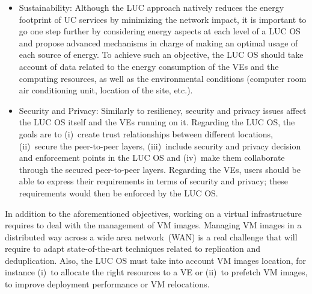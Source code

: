 \begin{itemize}
\item Sustainability: Although the LUC approach natively reduces the energy
footprint of UC services by minimizing the network impact, 
it is important to go one
step further by considering energy aspects at each level of a LUC OS
and propose advanced mechanisms in charge of making an optimal usage of each source of energy. 
 To achieve such an objective, the LUC OS should take account of data related to the energy
  consumption of the VEs  and the computing resources,
  as well as the environmental conditions (computer room air conditioning unit, location of the
  site, etc.).
\item Security and Privacy: Similarly to resiliency, security and privacy issues affect the LUC OS itself and the VEs running on it.
Regarding the LUC OS, the goals are to (i)~create trust relationships between
different locations, (ii)~secure the peer-to-peer layers, 
(iii)~include security and privacy decision and enforcement points in the LUC OS and (iv)~make them collaborate through the secured peer-to-peer layers. 
Regarding the VEs, users should be able to express their requirements in terms of security and privacy; these requirements would then be enforced by the LUC OS.


\end{itemize}

In addition to the aforementioned objectives, working on a virtual infrastructure 
requires to deal with
the management of VM images. Managing VM images in a distributed
way across a wide area network~(WAN) is a real challenge that will require to adapt
state-of-the-art techniques related to replication and deduplication. Also,
the LUC OS must take into account VM images
location, for instance (i)~to allocate the right resources to a VE  or (ii)~to prefetch
VM images, to improve deployment performance or VM relocations.

